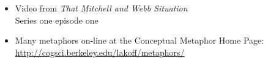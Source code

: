 \documentclass[headrule,footrule]{foils}
\begin{document}
 \begin{itemize}
 \item Video from \textit{That Mitchell and Webb Situation} 
\\ Series one episode one
  \item Many metaphors on-line at the Conceptual Metaphor Home Page:
\\ \url{http://cogsci.berkeley.edu/lakoff/metaphors/}
 \end{itemize}

 
 
\end{document}
